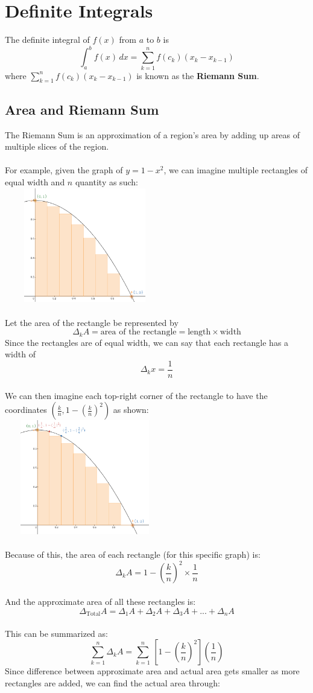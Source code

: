 \documentclass{article}
\begin{document}
\section{Definite Integrals}
The definite integral of $f(x)$ from $a$ to $b$ is
\[\int_{a}^b f(x) \,dx = \sum_{k=1}^{n} f(c_{k})(x_k-x_{k-1})\]
where $\sum_{k=1}^{n} f(c_{k})(x_k-x_{k-1})$ is known as the \textbf{Riemann Sum}.

\subsection*{Area and Riemann Sum}
The Riemann Sum is an approximation of a region's area by adding up areas of multiple slices of the region.
\\\\
For example, given the graph of $y = 1-x^2$, we can imagine multiple rectangles of equal width and $n$ quantity as such:
\\
\includegraphics[width=7cm, height=5cm]{riemann2.PNG}
\\\\
Let the area of the rectangle be represented by
\[\Delta_k{A} = \text{area of the rectangle} = \text{length} \times \text{width} \]
Since the rectangles are of equal width, we can say that each rectangle has a width of
\[\Delta_k{x} = \frac{1}{n}\]
\\
We can then imagine each top-right corner of the rectangle to have the coordinates $(\frac{k}{n}, 1-(\frac{k}{n})^2)$ as shown:
\\
\includegraphics[width=7cm, height=5cm]{riemann1.PNG}
\\\\
Because of this, the area of each rectangle (for this specific graph) is:
\[\Delta_kA = 1-(\frac{k}{n})^2 \times \frac{1}{n}\]
\\
And the approximate area of all these rectangles is:
\[\Delta_{\text{Total}}A = \Delta_1A + \Delta_2A + \Delta_3A + ... + \Delta_nA\]
\\
This can be summarized as:
\[\sum_{k=1}^{n} \Delta_{k}A = \sum_{k=1}^{n} \, [1-(\frac{k}{n})^2](\frac{1}{n})\]
Since difference between approximate area and actual area gets smaller as more rectangles are added, we can find the actual area through:
\end{document}
